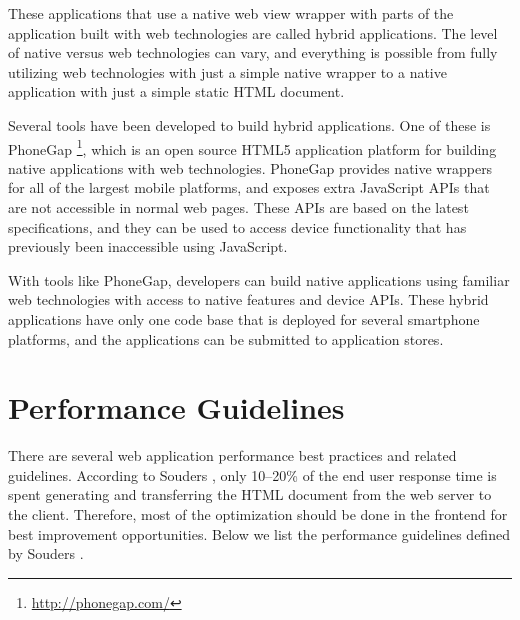 These applications that use a native web view wrapper with parts of
the application built with web technologies are called hybrid
applications. The level of native versus web technologies can vary,
and everything is possible from fully utilizing web technologies with
just a simple native wrapper to a native application with just a
simple static HTML document.

Several tools have been developed to build hybrid applications. One of
these is PhoneGap \footnote{\url{http://phonegap.com/}}, which is an
open source HTML5 application platform for building native
applications with web technologies. PhoneGap provides native wrappers
for all of the largest mobile platforms, and exposes extra JavaScript
APIs that are not accessible in normal web pages. These APIs are based
on the latest specifications, and they can be used to access device
functionality that has previously been inaccessible using JavaScript.

With tools like PhoneGap, developers can build native applications
using familiar web technologies with access to native features and
device APIs. These hybrid applications have only one code base that is
deployed for several smartphone platforms, and the applications can be
submitted to application stores.

\clearpage
\section{Performance Guidelines}
\label{section:performance-guidelines}

There are several web application performance best practices and
related guidelines. According to Souders \cite{souders2007high}, only
10--20\% of the end user response time is spent generating and
transferring the HTML document from the web server to the
client. Therefore, most of the optimization should be done in the
frontend for best improvement opportunities. Below we list the
performance guidelines defined by Souders \cite{souders2007high,
  souders2009even}.

